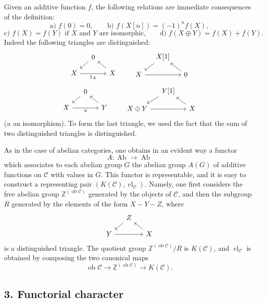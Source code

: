 \documentclass[11pt]{article}
\providecommand{\Ob}{\operatorname{ob}}
\providecommand{\cC}{\mathcal C}
\providecommand{\Ob}{\operatorname{ob}}
\providecommand{\Ab}{\operatorname{Ab}}
\providecommand{\cC}{\mathcal C}
\providecommand{\Ab}{\operatorname{Ab}}
\providecommand{\Ob}{\operatorname{Ob}}
\providecommand{\Ob}{\operatorname{ob}}
\providecommand{\Ob}{\operatorname{Ob}}
\begin{document}
Given an additive function $f$, the following relations are immediate consequences of the definition:
\[
\text{a) } f(0)=0,\qquad
\text{b) } f(X[n])=(-1)^n f(X),
\]
\[
\text{c) } f(X)=f(Y)\text{ if }X\text{ and }Y\text{ are isomorphic,}
\qquad
\text{d) } f(X\oplus Y)=f(X)+f(Y).
\]
Indeed the following triangles are distinguished:
\[
\begin{tikzcd}[column sep=small,row sep=small]
&0 \arrow[dl]\\ X \arrow[rr,"1_X"']&&X\arrow[ul]
\end{tikzcd}
\qquad
\begin{tikzcd}[column sep=small,row sep=small]
&X[1]\arrow[dl]\\ X\arrow[rr]&&0\arrow[ul]
\end{tikzcd}
\]
\[
\begin{tikzcd}[column sep=small,row sep=small]
&0\arrow[dl]\\ X\arrow[rr,"u"']&&Y\arrow[ul]
\end{tikzcd}
\qquad
\begin{tikzcd}[column sep=small,row sep=small]
&Y[1]\arrow[dl]\\ X\oplus Y\arrow[rr]&&X\arrow[ul]
\end{tikzcd}
\]
($u$ an isomorphism). To form the last triangle, we used the fact that the sum of two distinguished triangles is distinguished.

As in the case of abelian categories, one obtains in an evident way a functor
\[
A:\Ab\longrightarrow\Ab
\]
which associates to each abelian group $G$ the abelian group $A(G)$ of additive functions on $\cC$ with values in $G$. This functor is representable, and it is easy to construct a representing pair $(K(\cC),\operatorname{cl}_{\cC})$. Namely, one first considers the free abelian group $\mathbb Z^{(\Ob\cC)}$ generated by the objects of $\cC$, and then the subgroup $R$ generated by the elements of the form $X-Y-Z$, where
\[
\begin{tikzcd}[column sep=small,row sep=small]
&Z\arrow[dl]\\ Y\arrow[rr]&&X\arrow[ul]
\end{tikzcd}
\]
is a distinguished triangle. The quotient group $\mathbb Z^{(\Ob\cC)}/R$ is $K(\cC)$, and $\operatorname{cl}_{\cC}$ is obtained by composing the two canonical maps
\[
\Ob\cC\longrightarrow \mathbb Z^{(\Ob\cC)}\longrightarrow K(\cC).
\]

\subsection*{3. Functorial character}
\end{document}
